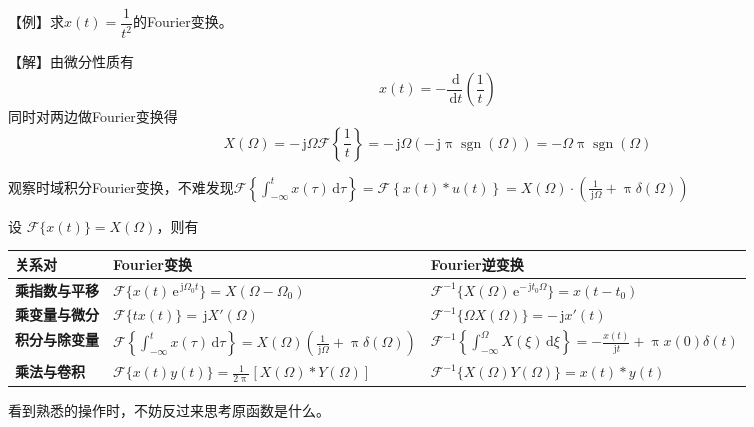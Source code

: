 \documentclass[UTF8,fontset=fandol,zihao=5]{ctexart}
\newcommand{\jj}{\,\mathrm{j}}
\newcommand{\ee}{\,\mathrm{e}}
\newcommand{\dd}{\,\mathrm{d}}
\newcommand{\FF}{\mathcal{F}}
\begin{document}
\begin{methodbox}[【技巧】用微分性质求Fourier变换]
  【例】求$x(t)=\dfrac{1}{t^2}$的Fourier变换。
  
  【解】由微分性质有
  \[
  x(t)=-\frac{\dd}{\dd t}\left ( \frac{1}{t} \right )
  \]
  同时对两边做Fourier变换得
  \[
  X(\varOmega) = -\jj \varOmega \FF \left \{ \frac{1}{t} \right \} = -\jj \varOmega \left ( -\jj \uppi \operatorname{sgn}(\varOmega) \right ) = - \varOmega \uppi \operatorname{sgn} (\varOmega)
  \]
\end{methodbox}

\begin{methodbox}[【理解】微分的实际意义]
  观察时域积分Fourier变换，不难发现$\displaystyle \FF \left\{ \int_{-\infty}^{t} x(\tau)\dd\tau \right\} = \FF\left\{x(t) \ast u(t) \right\} = X(\varOmega) \cdot \left( \frac{1}{\jj\varOmega} + \uppi\delta(\varOmega) \right)$
\end{methodbox}

\begin{methodbox}[【技巧】时频变换对应]
  设 $\FF\{x(t)\}=X(\varOmega)$，则有

  \begin{center}
  \begin{tabularx}{0.98\textwidth}{>{\bfseries}p{2.4cm}X X}
  \toprule
  关系对 & Fourier变换 & Fourier逆变换 \\
  \midrule

  乘指数与平移
  &
  $\displaystyle
  \FF\{x(t)\ee^{\jj\varOmega_0 t}\}
  =
  X(\varOmega-\varOmega_0)
  $
  &
  $\displaystyle
  \FF^{-1}
  \{X(\varOmega)\ee^{-\jj t_0 \varOmega}\}
  =
  x(t-t_0)
  $
  \\

  乘变量与微分
  &
  $\displaystyle
  \FF\{t x(t)\}
  =
  \jj X'(\varOmega)
  $
  &
  $\displaystyle
  \FF^{-1}\{\varOmega X(\varOmega)\}
  =
  -\jj x'(t)
  $
  \\

  积分与除变量
  &
  $\displaystyle
  \FF
  \left\{
    \int_{-\infty}^{t}x(\tau)\dd\tau
  \right\}
  =
  X(\varOmega)
  \left(
    \frac{1}{\jj\varOmega}
    +
    \uppi\delta(\varOmega)
  \right)
  $
  &
  $\displaystyle
  \FF^{-1}
  \left\{
    \int_{-\infty}^{\varOmega}X(\xi)\dd\xi
  \right\}
  =
  -\frac{x(t)}{\jj t}
  +
  \uppi x(0)\delta(t)
  $
  \\

  乘法与卷积
  &
  $\displaystyle
  \FF\{x(t)y(t)\}
  =
  \frac{1}{2\uppi}
  \left[
    X(\varOmega)\ast Y(\varOmega)
  \right]
  $
  &
  $\displaystyle
  \FF^{-1}
  \{X(\varOmega)Y(\varOmega)\}
  =
  x(t)\ast y(t)
  $
  \\

  \bottomrule
  \end{tabularx}
  \end{center}

  看到熟悉的操作时，不妨反过来思考原函数是什么。
\end{methodbox}
\end{document}
